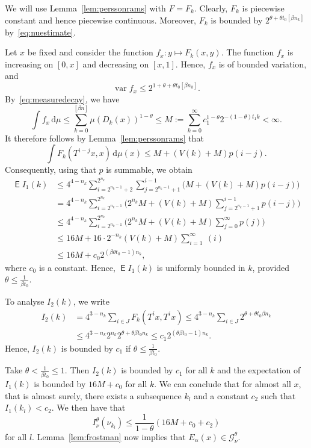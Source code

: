 \documentclass[10pt]{amsart}
\theoremstyle{definition}\newtheorem{defi}[theo]{Definition}\newtheorem{rema}[theo]{Remark}\newtheorem{exam}[theo]{Example}\newtheorem{exem}[theo]{Example}\newtheorem{nota}[theo]{Notation}
\DeclareMathOperator{\E}{\mathsf{E}}
\DeclareMathOperator{\var}{var}
\newcommand*{\dd}{\mathrm{d}}
\begin{document}
We will use Lemma~\ref{lem:perssonrams} with $F = F_k$. Clearly, $F_k$ is piecewise constant and hence piecewise continuous. Moreover, $F_k$ is bounded by $2^{\theta + \theta t_0 [\beta n_k]}$ by~\eqref{eq:nuestimate}.

Let $x$ be fixed and consider the function $f_x \colon y \mapsto F_k (x,y)$. The function $f_x$ is increasing on $[0,x]$ and decreasing on $[x,1]$. Hence, $f_x$ is of bounded variation, and
\[
\var f_x \leq 2^{1 + \theta + \theta t_0 [\beta n_k]}.
\]
By~\eqref{eq:measuredecay}, we have
\[
\int f_x \, \dd\mu \leq \sum_{k=0}^{[\beta n]} \mu (D_k (x))^{1-\theta} \leq M := \sum_{k=0}^\infty c_1^{1-\theta} 2^{- (1-\theta) t_1 k} < \infty.
\]
It therefore follows by Lemma~\ref{lem:perssonrams} that
\[
\int F_k (T^{i-j} x, x) \, \dd \mu (x) \leq M + (V(k) + M) p (i-j).
\]
Consequently, using that $p$ is summable, we obtain
\begin{align*}
\E I_1 (k) &\leq 4^{4-n_k} \sum_{i=2^{n_k-1}+2}^{2^{n_k}}
\sum_{j=2^{n_k-1}+1}^{i-1} \bigl(M + (V(k) + M) p (i-j) \bigr)
\\ &= 4^{4-n_k} \sum_{i=2^{n_k-1}}^{2^{n_k}} \bigl(2^{n_k} M + (V(k) + M) \sum_{j=2^{n_k-1}+1}^{i-1} p (i-j) \bigr) \\ &\leq 4^{4-n_k} \sum_{i=2^{n_k-1}}^{2^{n_k}} \bigl(2^{n_k} M + (V(k) + M)
\sum_{j=0}^\infty p (j) \bigr) \\ &\leq 16 M + 16 \cdot 2^{-n_k} (V(k) + M) \sum_{i=1}^\infty~(i) \\ & \leq 16 M + c_0 2^{(\beta
\theta t_0 -1) n_k},
\end{align*}
where $c_0$ is a constant. Hence, $\E I_1 (k)$ is uniformly bounded in $k$, provided $\theta \leq
\frac{1}{\beta t_0}$.

To analyse $I_2 (k)$, we write
\begin{align*}
I_2 (k) &= 4^{3-n_k} \sum_{i \in J} F_k (T^i x, T^i x) \leq 4^{3-n_k} \sum_{i \in J} 2^{\theta + \theta t_0 \beta n_k} \\ &\leq 4^{3-n_k} 2^{n_k} 2^{\theta + \theta \beta t_0 n_k} \leq c_1 2^{(\theta \beta t_0 - 1) n_k}.
\end{align*}
Hence, $I_2 (k)$ is bounded by $c_1$ if $\theta \leq \frac{1}{\beta t_0}$.

Take $\theta < \frac{1}{\beta t_0} \leq 1$. Then $I_2 (k)$ is bounded by $c_1$ for all $k$ and the expectation of $I_1 (k)$ is bounded by $16M + c_0$ for all $k$. We can conclude that for almost all $x$, that is almost surely, there exists a subsequence $k_l$ and a constant $c_2$ such that $I_1 (k_l) < c_2$. We then have that
\[
I_\nu^\theta (\nu_{k_l}) \leq \frac{1}{1-\theta} (16M + c_0 + c_2)
\]
for all $l$. Lemma~\ref{lem:frostman} now implies that $E_\alpha (x)
\in \mathscr{G}_\nu^\theta$.
\end{document}
